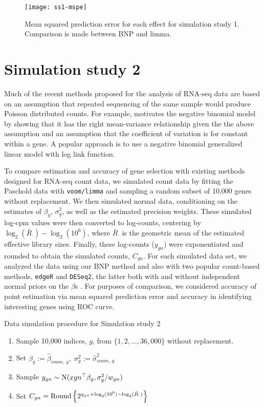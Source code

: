 \begin{itemize}
\begin{figure}[ht!]
\centering
\texttt{[image: ss1-mspe]}
\begin{minipage}{.8\textwidth}
\caption{\small Mean squared prediction error for each effect for simulation study 1. Comparison is made between BNP and limma.}
\label{mspe-ss1}
\end{minipage}
\end{figure}

\section{Simulation study 2}
\label{sec:ss2}
Much of the recent methods proposed for the analysis of RNA-seq data are based on an assumption that repeated sequencing of the same sample would produce Poisson distributed counts. For example, \cite{mccarthy} motivates the negative binomial model by showing that it has the right mean-variance relationship given the the above assumption and an assumption that the coefficient of variation is for constant within a gene. A popular approach is to use a negative binomial generalized linear model with log link function.

To compare estimation and accuracy of gene selection with existing methods designed for RNA-seq count data, we simulated count data by fitting the Paschold data with \texttt{voom/limma} and sampling a random subset of 10,000 genes without replacement. We then simulated normal data, conditioning on the estimates of $\beta_g$, $\sigma^2_g$, as well as the estimated precision weights. These simulated log-cpm values were then converted to log-counts, centering by $\log_2(\bar{R}_\cdot)-\log_2(10^6)$, where $\bar{R}_\cdot$ is the geometric mean of the estimated effective library sizes. Finally, these log-counts ($y_{gn}$) were exponentiated and rounded to obtain the simulated counts, $C_{gn}$. For each simulated data set, we analyzed the data using our BNP method and also with two popular count-based methods, \texttt{edgeR} and \texttt{DESeq2}, the latter both with and without independent normal priors on the $\beta$s \citep{edger2010,deseq2014}. For purposes of comparison, we considered accuracy of point estimation via mean squared prediction error and accuracy in identifying interesting genes using ROC curve.
\begin{table}
\caption{Data simulation procedure for Simulation study 2}
\begin{enumerate}
\item Sample 10,000 indices, $g$, from $\{1,2,\ldots,36,000\}$ without replacement.
\item Set $\beta_g:= \hat{\beta}_{voom,~g},\; \sigma^2_g:= \hat{\sigma}^2_{voom,~g}$
\item Sample $y_{gn} \sim \operatorname{N}(x{gn}^\top\beta_g, \sigma^2_g/w_{gn})$
\item Set $C_{gn} = \operatorname{Round} \left\{ 2^{y_{gn} + \log_2(10^6) - \log_2(\bar{R}_{\cdot})} \right\}$
\end{enumerate}
\end{table}



\end{itemize}
